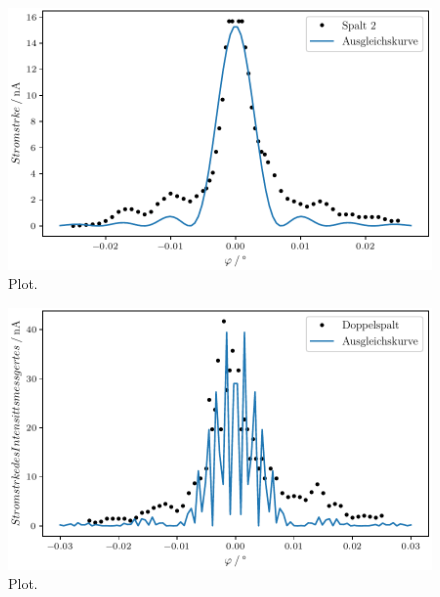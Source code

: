   \begin{figure}
    \centering
    \includegraphics{plot1.pdf}
    \caption{Plot.}
    \label{fig:plot}
  \end{figure}

  \begin{figure}
    \centering
    \includegraphics{plot2.pdf}
    \caption{Plot.}
    \label{fig:plot}
  \end{figure}